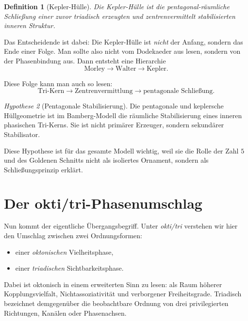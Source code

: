 \documentclass[11pt,a4paper]{article}
\newtheorem{definition}{Definition}[section]
\theoremstyle{remark}
\newtheorem{hypothese}[definition]{Hypothese}
\begin{document}
	\begin{definition}[Kepler-Hülle]
		Die \emph{Kepler-Hülle} ist die pentagonal-räumliche Schließung einer zuvor triadisch erzeugten und zentrenvermittelt stabilisierten inneren Struktur.
	\end{definition}
	
	Das Entscheidende ist dabei: Die Kepler-Hülle ist \emph{nicht} der Anfang, sondern das Ende einer Folge. Man sollte also nicht vom Dodekaeder aus lesen, sondern von der Phasenbindung aus. Dann entsteht eine Hierarchie
	\begin{equation}
		\text{Morley} \longrightarrow \text{Walter} \longrightarrow \text{Kepler}.
	\end{equation}
	
	Diese Folge kann man auch so lesen:
	\begin{equation}
		\text{Tri-Kern} \longrightarrow \text{Zentrenvermittlung} \longrightarrow \text{pentagonale Schließung}.
	\end{equation}
	
	\begin{hypothese}[Pentagonale Stabilisierung]
		Die pentagonale und keplersche Hüllgeometrie ist im Bamberg-Modell die räumliche Stabilisierung eines inneren phasischen Tri-Kerns. Sie ist nicht primärer Erzeuger, sondern sekundärer Stabilisator.
	\end{hypothese}
	
	Diese Hypothese ist für das gesamte Modell wichtig, weil sie die Rolle der Zahl $5$ und des Goldenen Schnitts nicht als isoliertes Ornament, sondern als Schließungsprinzip erklärt.
	
	\section{Der okti/tri-Phasenumschlag}
	
	Nun kommt der eigentliche Übergangsbegriff. Unter \emph{okti/tri} verstehen wir hier den Umschlag zwischen zwei Ordnungsformen:
	\begin{itemize}
		\item einer \emph{oktonischen} Vielheitsphase,
		\item einer \emph{triadischen} Sichtbarkeitsphase.
	\end{itemize}
	
	Dabei ist \glqq oktonisch\grqq{} in einem erweiterten Sinn zu lesen: als Raum höherer Kopplungsvielfalt, Nichtassoziativität und verborgener Freiheitsgrade. \glqq Triadisch\grqq{} bezeichnet demgegenüber die beobachtbare Ordnung von drei privilegierten Richtungen, Kanälen oder Phasenachsen.
	
\end{document}
